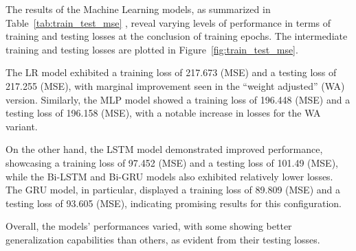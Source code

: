 The results of the Machine Learning models, as summarized in Table~\ref{tab:train_test_mse} , reveal varying levels of performance in terms of training and testing losses at the conclusion of training epochs.
The intermediate training and testing losses are plotted in Figure~\ref{fig:train_test_mse}.

The LR model exhibited a training loss of 217.673 (MSE) and a testing loss of 217.255 (MSE), with marginal improvement seen in the \enquote{weight adjusted} (WA) version.
Similarly, the MLP model showed a training loss of 196.448 (MSE) and a testing loss of 196.158 (MSE), with a notable increase in losses for the WA variant.

On the other hand, the LSTM model demonstrated improved performance, showcasing a training loss of 97.452 (MSE) and a testing loss of 101.49 (MSE), while the Bi-LSTM and Bi-GRU models also exhibited relatively lower losses.
The GRU model, in particular, displayed a training loss of 89.809 (MSE) and a testing loss of 93.605 (MSE), indicating promising results for this configuration.

Overall, the models' performances varied, with some showing better generalization capabilities than others, as evident from their testing losses.

